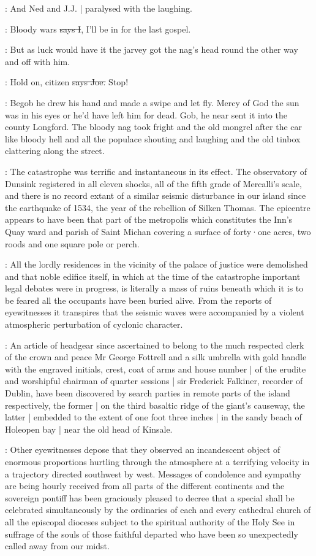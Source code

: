 \Nq:
And Ned and J.J. |
paralysed with the laughing.

:
Bloody wars
\sout{says I},
I'll be in for the last gospel.

\Nq:
But as luck would have it
the jarvey got the nag's head round the
other way and off with him.

\joe:
Hold on,
citizen
\sout{says Joe.}
Stop!

\Nq:
Begob he drew his hand and made a swipe and let fly.
Mercy of God the sun was in his eyes or he'd have left him for dead.
Gob,
he near sent it into the county Longford.
The bloody nag took fright
and the old mongrel
after the car like bloody hell and all the populace shouting and laughing
and the old tinbox clattering along the street.

:
The catastrophe was terrific and instantaneous in its effect.
The observatory of Dunsink registered in all eleven shocks,
all of the fifth grade of Mercalli's scale,
and there is no record extant of a similar
seismic disturbance in our island since the earthquake of 1534,
the year of the rebellion of Silken Thomas.
The epicentre appears to have
been that part of the metropolis which constitutes the Inn's Quay
ward and parish of Saint Michan covering a surface of forty·one acres,
two roods and one square pole or perch.

:
All the lordly residences in
the vicinity of the palace of justice were demolished and that noble
edifice itself,
in which at the time of the catastrophe important
legal debates were in progress,
is literally a mass of ruins beneath
which it is to be feared all the occupants have been buried alive.
From the reports of eyewitnesses it transpires that the seismic waves
were accompanied
by a violent atmospheric perturbation of cyclonic character.

:
An article of headgear since ascertained to belong to the much
respected clerk of the crown and peace Mr George Fottrell and a silk
umbrella with gold handle with the engraved initials,
crest,
coat of arms
and house number |
of the erudite and worshipful chairman of quarter sessions |
sir Frederick Falkiner,
recorder of Dublin,
have been discovered by search parties in remote parts of the island respectively,
the former |
on the third basaltic ridge of the giant's causeway,
the latter |
embedded to the extent of one foot three inches |
in the sandy beach of Holeopen bay |
near the old head of Kinsale.

:
Other eyewitnesses depose that they observed an incandescent object of enormous proportions
hurtling through
the atmosphere at a terrifying velocity in a trajectory directed southwest by west.
Messages of condolence and sympathy are being
hourly received from all parts of the different continents and the
sovereign pontiff has been graciously pleased to decree that a
special  shall be celebrated simultaneously by
the ordinaries of each and every cathedral church of all the episcopal
dioceses subject to the spiritual authority of the Holy See in suffrage of
the souls of those faithful departed who have been so unexpectedly called
away from our midst.

